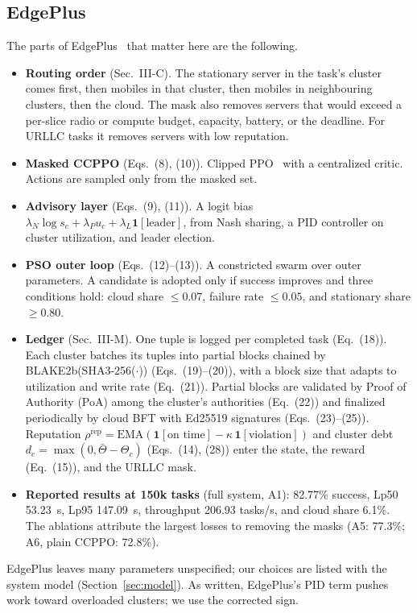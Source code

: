 \documentclass[11pt,journal,onecolumn]{IEEEtran}
\begin{document}
\subsection{EdgePlus}
The parts of EdgePlus~\cite{edgeplus} that matter here are the following.
\begin{itemize}
\item \textbf{Routing order} (Sec.~III-C). The stationary server in the task's cluster comes first, then mobiles in that cluster, then mobiles in neighbouring clusters, then the cloud. The mask also removes servers that would exceed a per-slice radio or compute budget, capacity, battery, or the deadline. For URLLC tasks it removes servers with low reputation.
\item \textbf{Masked CCPPO} (Eqs.~(8), (10)). Clipped PPO~\cite{ppo} with a centralized critic. Actions are sampled only from the masked set.
\item \textbf{Advisory layer} (Eqs.~(9), (11)). A logit bias $\lambda_N \log s_c + \lambda_P u_c + \lambda_L \mathbf{1}[\text{leader}]$, from Nash sharing, a PID controller on cluster utilization, and leader election.
\item \textbf{PSO outer loop} (Eqs.~(12)--(13)). A constricted swarm over outer parameters. A candidate is adopted only if success improves and three conditions hold: cloud share $\le 0.07$, failure rate $\le 0.05$, and stationary share $\ge 0.80$.
\item \textbf{Ledger} (Sec.~III-M). One tuple is logged per completed task (Eq.~(18)). Each cluster batches its tuples into partial blocks chained by BLAKE2b(SHA3-256($\cdot$)) (Eqs.~(19)--(20)), with a block size that adapts to utilization and write rate (Eq.~(21)). Partial blocks are validated by Proof of Authority (PoA) among the cluster's authorities (Eq.~(22)) and finalized periodically by cloud BFT with Ed25519 signatures (Eqs.~(23)--(25)). Reputation $\rho^{\mathrm{rep}} = \mathrm{EMA}(\mathbf{1}[\text{on time}] - \kappa\,\mathbf{1}[\text{violation}])$ and cluster debt $d_c = \max(0, \bar{\Theta} - \Theta_c)$ (Eqs.~(14), (28)) enter the state, the reward (Eq.~(15)), and the URLLC mask.
\item \textbf{Reported results at 150k tasks} (full system, A1): 82.77\% success, Lp50 53.23~s, Lp95 147.09~s, throughput 206.93 tasks/s, and cloud share 6.1\%. The ablations attribute the largest losses to removing the masks (A5: 77.3\%; A6, plain CCPPO: 72.8\%).
\end{itemize}
EdgePlus leaves many parameters unspecified; our choices are listed with the system model (Section~\ref{sec:model}). As written, EdgePlus's PID term pushes work toward overloaded clusters; we use the corrected sign.
\end{document}
